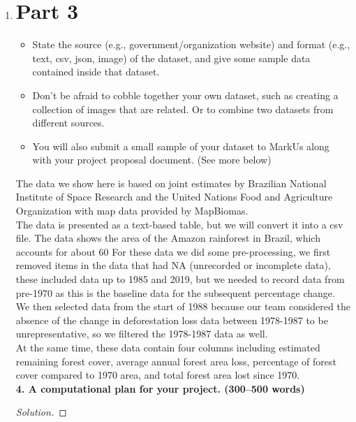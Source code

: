 \documentclass[12pt]{article}
\newenvironment{solution}
  {\renewcommand\qedsymbol{$\blacksquare$}
  \begin{proof}[Solution]}
  {\end{proof}}
\renewcommand\qedsymbol{$\blacksquare$}
\begin{document}
\begin{enumerate}
\newpage

\item \section*{Part 3}

\begin{itemize}
    \item State the source (e.g., government/organization website) and format (e.g., text, csv, json, image) of the dataset, and give some sample data contained inside that dataset.
    \item Don’t be afraid to cobble together your own dataset, such as creating a collection of images that are related. Or to combine two datasets from different sources.
    \item You will also submit a small sample of your dataset to MarkUs along with your project proposal document. (See more below)
\end{itemize}


The data we show here is based on joint estimates by Brazilian National Institute of Space Research and the United Nations Food and Agriculture Organization with map data provided by MapBiomas.\\
    The data is presented as a text-based table, but we will convert it into a csv file. The data shows the area of the Amazon rainforest in Brazil, which accounts for about 60%
    For these data we did some pre-processing, we first removed items in the data that had NA (unrecorded or incomplete data), these included data up to 1985 and 2019, but we needed to record data from pre-1970 as this is the baseline data for the subsequent percentage change.\\
    We then selected data from the start of 1988 because our team considered the absence of the change in deforestation loss data between 1978-1987 to be unrepresentative, so we filtered the 1978-1987 data as well.\\
    At the same time, these data contain four columns including estimated remaining forest cover, average annual forest area loss, percentage of forest cover compared to 1970 area, and total forest area lost since 1970.\\
    

\textbf{\large 4. A computational plan for your project. (300–500 words)}
\begin{solution}
\end{solution}


\end{enumerate}
\end{document}

